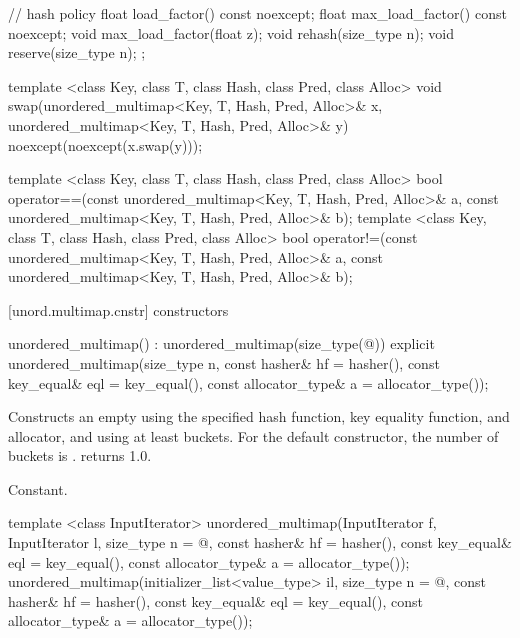 \begin{codeblock}
{{    // hash policy
    float load_factor() const noexcept;
    float max_load_factor() const noexcept;
    void max_load_factor(float z);
    void rehash(size_type n);
    void reserve(size_type n);
  };

  template <class Key, class T, class Hash, class Pred, class Alloc>
    void swap(unordered_multimap<Key, T, Hash, Pred, Alloc>& x,
              unordered_multimap<Key, T, Hash, Pred, Alloc>& y)
      noexcept(noexcept(x.swap(y)));

  template <class Key, class T, class Hash, class Pred, class Alloc>
    bool operator==(const unordered_multimap<Key, T, Hash, Pred, Alloc>& a,
                    const unordered_multimap<Key, T, Hash, Pred, Alloc>& b);
  template <class Key, class T, class Hash, class Pred, class Alloc>
    bool operator!=(const unordered_multimap<Key, T, Hash, Pred, Alloc>& a,
                    const unordered_multimap<Key, T, Hash, Pred, Alloc>& b);
}
\end{codeblock}

[unord.multimap.cnstr]{ constructors}

%
\begin{itemdecl}
unordered_multimap() : unordered_multimap(size_type(@\seebelow@)) { }
explicit unordered_multimap(size_type n,
                            const hasher& hf = hasher(),
                            const key_equal& eql = key_equal(),
                            const allocator_type& a = allocator_type());
\end{itemdecl}

\begin{itemdescr}
\pnum
\effects Constructs an empty  using the
specified hash function, key equality function, and allocator, and
using at least  buckets.  For the default constructor,
the number of buckets is .
 returns 1.0.

\pnum
\complexity Constant.
\end{itemdescr}

%
\begin{itemdecl}
template <class InputIterator>
  unordered_multimap(InputIterator f, InputIterator l,
                     size_type n = @\seebelow@,
                     const hasher& hf = hasher(),
                     const key_equal& eql = key_equal(),
                     const allocator_type& a = allocator_type());
unordered_multimap(initializer_list<value_type> il,
                   size_type n = @\seebelow@,
                   const hasher& hf = hasher(),
                   const key_equal& eql = key_equal(),
                   const allocator_type& a = allocator_type());
\end{itemdecl}

